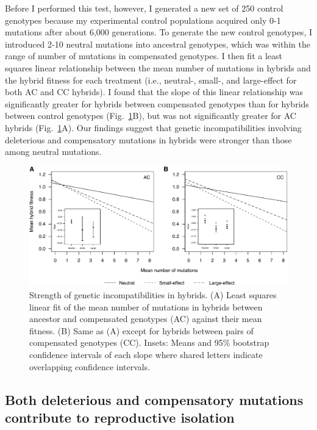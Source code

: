 \begin{doublespace}
Before I performed this test, however,
I generated a new set of 250 control genotypes
because my experimental control populations
acquired only 0-1 mutations after about 6,000 generations.
%
To generate the new control genotypes,
I introduced 2-10 neutral mutations into ancestral genotypes,
which was within the range of number of mutations in compensated genotypes.
%
I then fit a least squares linear relationship between
the mean number of mutations in hybrids
and the hybrid fitness for each treatment
(i.e., neutral-, small-, and large-effect for both AC and CC hybrids).
%
I found that the slope of this linear relationship
was significantly greater for hybrids between compensated genotypes
than for hybrids between control genotypes (Fig.~\ref{fig2}B),
but was not significantly greater for AC hybrids (Fig.~\ref{fig2}A).
%
Our findings suggest that genetic incompatibilities
involving deleterious and compensatory mutations in hybrids
were stronger than those among neutral mutations.



\begin{figure}
\centering
\includegraphics[width=\linewidth]{fig2.pdf}
\caption{Strength of genetic incompatibilities in hybrids.
  (A) Least squares linear fit of the mean number of mutations in hybrids
  between ancestor and compensated genotypes (AC) against their mean fitness.
  (B) Same as (A) except for hybrids between pairs of compensated genotypes
  (CC). Insets: Means and 95\% bootstrap confidence intervals of each slope
  where shared letters indicate overlapping confidence intervals.}
\label{fig2}
\end{figure}



\subsection{Both deleterious and compensatory mutations
  contribute to reproductive isolation}


\end{doublespace}
